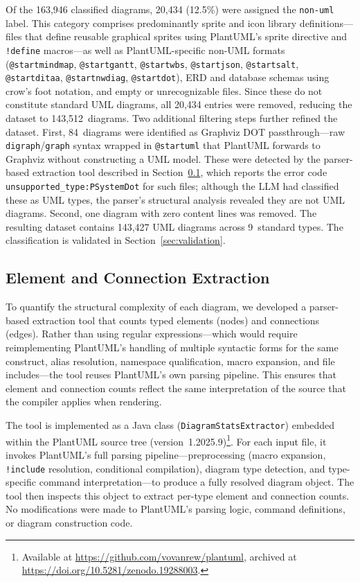 \documentclass[data,datadescriptor,submit,pdftex,moreauthors]{Definitions/mdpi}
\begin{document}
Of the 163,946 classified diagrams, 20,434 (12.5\%) were assigned the \texttt{non-uml} label. This category comprises predominantly sprite and icon library definitions---files that define reusable graphical sprites using PlantUML's sprite directive and \texttt{!define} macros---as well as PlantUML-specific non-UML formats (\texttt{@startmindmap}, \texttt{@startgantt}, \texttt{@startwbs}, \texttt{@startjson}, \texttt{@startsalt}, \texttt{@startditaa}, \texttt{@startnwdiag}, \texttt{@startdot}), ERD and database schemas using crow's foot notation, and empty or unrecognizable files. Since these do not constitute standard UML diagrams, all 20,434 entries were removed, reducing the dataset to 143,512~diagrams. Two additional filtering steps further refined the dataset. First, 84~diagrams were identified as Graphviz DOT passthrough---raw \texttt{digraph}/\texttt{graph} syntax wrapped in \texttt{@startuml} that PlantUML forwards to Graphviz without constructing a UML model. These were detected by the parser-based extraction tool described in Section~\ref{sec:element-extraction}, which reports the error code \texttt{unsupported\_type:PSystemDot} for such files; although the LLM had classified these as UML types, the parser's structural analysis revealed they are not UML diagrams. Second, one diagram with zero content lines was removed. The resulting dataset contains 143,427 UML diagrams across 9~standard types. The classification is validated in Section~\ref{sec:validation}.

\subsection{Element and Connection Extraction}
\label{sec:element-extraction}

To quantify the structural complexity of each diagram, we developed a parser-based extraction tool that counts typed elements (nodes) and connections (edges). Rather than using regular expressions---which would require reimplementing PlantUML's handling of multiple syntactic forms for the same construct, alias resolution, namespace qualification, macro expansion, and file includes---the tool reuses PlantUML's own parsing pipeline. This ensures that element and connection counts reflect the same interpretation of the source that the compiler applies when rendering.

The tool is implemented as a Java class (\texttt{DiagramStatsExtractor}) embedded within the PlantUML source tree (version~1.2025.9)\footnote{Available at \url{https://github.com/vovanrew/plantuml}, archived at \url{https://doi.org/10.5281/zenodo.19288003}.}. For each input file, it invokes PlantUML's full parsing pipeline---preprocessing (macro expansion, \texttt{!include} resolution, conditional compilation), diagram type detection, and type-specific command interpretation---to produce a fully resolved diagram object. The tool then inspects this object to extract per-type element and connection counts. No modifications were made to PlantUML's parsing logic, command definitions, or diagram construction code.
\end{document}
